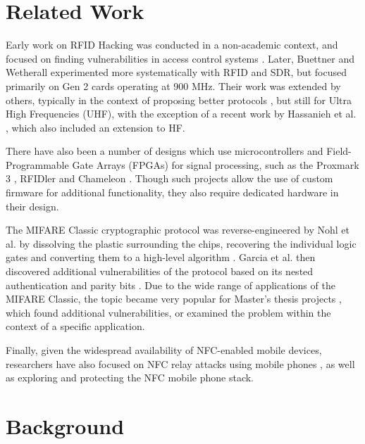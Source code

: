 \documentclass[fleqn,10pt]{SelfArx} %
\begin{document}
\section{Related Work}
\label{sec:related}

Early work on RFID Hacking was conducted in a non-academic context, and focused on finding vulnerabilities in access control systems \cite{ccc, mbta}. Later,  Buettner and Wetherall \cite{sdruhf, gen2usrp, phymac} experimented more systematically with RFID and SDR, but focused primarily on Gen 2 cards operating at 900 MHz. Their work was extended by others, typically in the context of proposing better protocols \cite{gnuradio, zoe}, but still for Ultra High Frequencies (UHF), with the exception of a recent work by Hassanieh et al. \cite{randomization}, which also included an extension to HF.  

There have also been a number of designs which use microcontrollers and Field-Programmable Gate Arrays (FPGAs) for signal processing, such as the Proxmark 3 \cite{proxmark}, RFIDler \cite{rfidler} and Chameleon \cite{chameleon}. Though such projects allow the use of custom firmware for additional functionality, they also require dedicated hardware in their design.

The MIFARE Classic cryptographic protocol was reverse-engineered by Nohl et al. by dissolving the plastic surrounding the chips, recovering the individual logic gates and converting them to a high-level algorithm \cite{crypto1}. Garcia et al. then discovered additional vulnerabilities of the protocol based on its nested authentication and parity bits \cite{classicvulnerabilities}. Due to the wide range of applications of the MIFARE Classic, the topic became very popular for Master's thesis projects \cite{classicimplementation, chipkaart, classicrng, imperial}, which found additional vulnerabilities, or examined the problem within the context of a specific application.

Finally, given the widespread availability of NFC-enabled mobile devices, researchers have also focused on NFC relay attacks using mobile phones \cite{relay, practicalrelay}, as well as exploring \cite{nfcsurface} and protecting \cite{engarde} the NFC mobile phone stack. 




\section{Background}
\label{sec:background}
\end{document}
